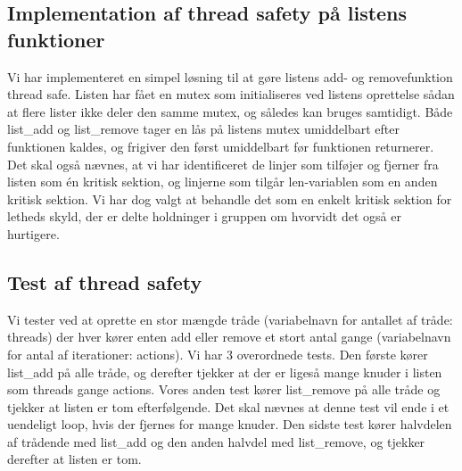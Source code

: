 \subsection{Implementation af thread safety på listens funktioner}
Vi har implementeret en simpel løsning til at gøre listens add- og removefunktion thread safe. Listen har fået en mutex som initialiseres ved listens oprettelse sådan at flere lister ikke deler den samme mutex, og således kan bruges samtidigt. Både list\_add og list\_remove tager en lås på listens mutex umiddelbart efter funktionen kaldes, og frigiver den først umiddelbart før funktionen returnerer.
Det skal også nævnes, at vi har identificeret de linjer som tilføjer og fjerner fra listen som én kritisk sektion, og linjerne som tilgår len-variablen som en anden kritisk sektion. Vi har dog valgt at behandle det som en enkelt kritisk sektion for letheds skyld, der er delte holdninger i gruppen om hvorvidt det også er hurtigere.

\subsection{Test af thread safety}
Vi tester ved at oprette en stor mængde tråde (variabelnavn for antallet af tråde: threads) der hver kører enten add eller remove et stort antal gange (variabelnavn for antal af iterationer: actions). 
Vi har 3 overordnede tests. 
Den første kører list\_add på alle tråde, og derefter tjekker at der er ligeså mange knuder i listen som threads gange actions.
Vores anden test kører list\_remove på alle tråde og tjekker at listen er tom efterfølgende. Det skal nævnes at denne test vil ende i et uendeligt loop, hvis der fjernes for mange knuder.
Den sidste test kører halvdelen af trådende med list\_add og den anden halvdel med list\_remove, og tjekker derefter at listen er tom. 

